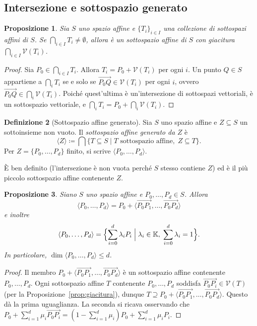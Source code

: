 \documentclass[11pt, a4paper]{book}
\theoremstyle{definition}
\newtheorem{definizione}{Definizione}[section]
\theoremstyle{plain}
\newtheorem{proposizione}[definizione]{Proposizione}
\theoremstyle{remark}
\newcommand{\K}{\mathbb{K}}
\newcommand{\VV}{\mathcal{V}}   %
\begin{document}
\subsection{Intersezione e sottospazio generato}

\begin{proposizione}
\label{prop:intersezione-affine}
Sia $S$ uno spazio affine e $\{T_i\}_{i \in I}$ una collezione di sottospazi affini di $S$. Se $\bigcap_{i \in I} T_i \neq \emptyset$, allora è un sottospazio affine di $S$ con giacitura $\bigcap_{i \in I} \VV(T_i)$.
\end{proposizione}

\begin{proof}
Sia $P_0 \in \bigcap_{i \in I} T_i$. Allora $T_i = P_0 + \VV(T_i)$ per ogni $i$. Un punto $Q \in S$ appartiene a $\bigcap_i T_i$ se e solo se $\overrightarrow{P_0Q} \in \VV(T_i)$ per ogni $i$, ovvero $\overrightarrow{P_0Q} \in \bigcap_i \VV(T_i)$. Poiché quest'ultima è un'intersezione di sottospazi vettoriali, è un sottospazio vettoriale, e $\bigcap_i T_i = P_0 + \bigcap_i \VV(T_i)$.
\end{proof}

\begin{defbox}
\begin{definizione}[Sottospazio affine generato]
\label{def:span-affine}
Sia $S$ uno spazio affine e $Z \subseteq S$ un sottoinsieme non vuoto. Il \emph{sottospazio affine generato da $Z$} è
\[
  \langle Z \rangle \coloneqq \bigcap \{ T \subseteq S \mid T \text{ sottospazio affine},\; Z \subseteq T \}.
\]
Per $Z = \{P_0, \ldots, P_d\}$ finito, si scrive $\langle P_0, \ldots, P_d \rangle$.
\end{definizione}
\end{defbox}

È ben definito (l'intersezione è non vuota perché $S$ stesso contiene $Z$) ed è il più piccolo sottospazio affine contenente $Z$.

\begin{proposizione}
\label{prop:generato-finito}
Siano $S$ uno spazio affine e $P_0, \ldots, P_d \in S$. Allora
\[
  \langle P_0, \ldots, P_d \rangle = P_0 + \langle \overrightarrow{P_0P_1}, \ldots, \overrightarrow{P_0P_d} \rangle
\]
e inoltre
\[
  \langle P_0, \ldots, P_d \rangle = \Bigl\{ \sum_{i=0}^d \lambda_i P_i \;\Big|\; \lambda_i \in \K,\; \sum_{i=0}^d \lambda_i = 1 \Bigr\}.
\]
In particolare, $\dim \langle P_0, \ldots, P_d \rangle \leq d$.
\end{proposizione}

\begin{proof}
Il membro $P_0 + \langle \overrightarrow{P_0P_1}, \ldots, \overrightarrow{P_0P_d}\rangle$ è un sottospazio affine contenente $P_0, \ldots, P_d$. Ogni sottospazio affine $T$ contenente $P_0, \ldots, P_d$ soddisfa $\overrightarrow{P_0P_i} \in \VV(T)$ (per la Proposizione~\ref{prop:giacitura}), dunque $T \supseteq P_0 + \langle \overrightarrow{P_0P_1},\ldots,\overrightarrow{P_0P_d}\rangle$. Questo dà la prima uguaglianza. La seconda si ricava osservando che $P_0 + \sum_{i=1}^d \mu_i \overrightarrow{P_0P_i} = (1 - \sum_{i=1}^d \mu_i)P_0 + \sum_{i=1}^d \mu_i P_i$.
\end{proof}
\end{document}

